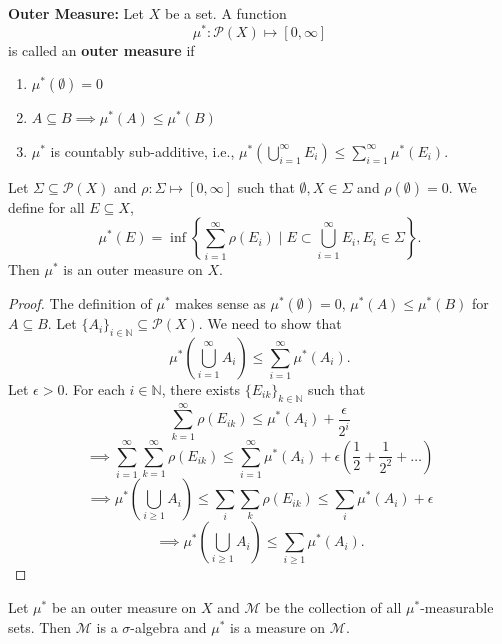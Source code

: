 \documentclass{functionspaces}
\begin{document}
\textbf{Outer Measure:} Let \( X \) be a set. A function
\[
\mu^* : \mathcal{P}(X) \mapsto [0, \infty]
\]
is called an \textbf{outer measure} if

\begin{enumerate}[label=(\arabic*)]
    \item \( \mu^*(\emptyset) = 0 \)
    \item \( A \subseteq B \implies \mu^*(A) \leq \mu^*(B) \)
    \item \( \mu^* \) is countably sub-additive, i.e., \( \mu^*\left( \bigcup_{i=1}^{\infty} E_i \right) \leq \sum_{i=1}^{\infty} \mu^*(E_i) \).
\end{enumerate}

\begin{theorem}
Let \( \Sigma \subseteq \mathcal{P}(X) \) and \( \rho : \Sigma \mapsto [0, \infty] \) such that \( \emptyset, X \in \Sigma \) and \( \rho(\emptyset) = 0 \). We define for all \( E \subseteq X \),
\[
\mu^*(E) = \inf \left\{ \sum_{i=1}^{\infty} \rho(E_i) \mid E \subset \bigcup_{i=1}^{\infty} E_i, E_i \in \Sigma \right\}.
\]
Then \( \mu^* \) is an outer measure on \( X \).
\end{theorem}

\begin{proof}
The definition of \( \mu^* \) makes sense as \( \mu^*(\emptyset) = 0 \), \( \mu^*(A) \leq \mu^*(B) \) for \( A \subseteq B \). Let \( \{A_i\}_{i \in \mathbb{N}} \subseteq \mathcal{P}(X) \). We need to show that
\[
\mu^*\left( \bigcup_{i=1}^{\infty} A_i \right) \leq \sum_{i=1}^{\infty} \mu^*(A_i).
\]
Let \( \epsilon > 0 \). For each \( i \in \mathbb{N} \), there exists \( \{E_{ik}\}_{k \in \mathbb{N}} \) such that
\[
\sum_{k=1}^{\infty} \rho(E_{ik}) \leq \mu^*(A_i) + \frac{\epsilon}{2^i} 
\]
\[
\implies \sum_{i=1}^{\infty} \sum_{k=1}^{\infty} \rho(E_{ik}) \leq \sum_{i=1}^{\infty} \mu^*(A_i) + \epsilon \left( \frac{1}{2} + \frac{1}{2^2} + \ldots \right) 
\]
\[
\implies \mu^*\left( \bigcup_{i \geq 1} A_i \right) \leq \sum_{i} \sum_{k} \rho(E_{ik}) \leq \sum_{i} \mu^*(A_i) + \epsilon 
\]
\[
\implies \mu^*\left( \bigcup_{i \geq 1} A_i \right) \leq \sum_{i \geq 1} \mu^*(A_i).
\]
\end{proof}

\begin{theorem}
Let \( \mu^* \) be an outer measure on \( X \) and \( \mathcal{M} \) be the collection of all \( \mu^* \)-measurable sets. Then \( \mathcal{M} \) is a \( \sigma \)-algebra and \( \mu^* \) is a measure on \( \mathcal{M} \).
\end{theorem}
\end{document}
